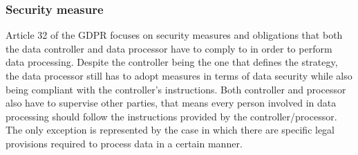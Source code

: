 \subsubsection{Security measure}
Article 32 of the GDPR focuses on security measures and obligations that both the data controller and data processor have to comply to in order to perform data processing. Despite the controller being the one that defines the strategy, the data processor still has to adopt measures in terms of data security while also being compliant with the controller's instructions. Both controller and processor also have to supervise other parties, that means every person involved in data processing should follow the instructions provided by the controller/processor. The only exception is represented by the case in which there are specific legal provisions required to process data in a certain manner.


